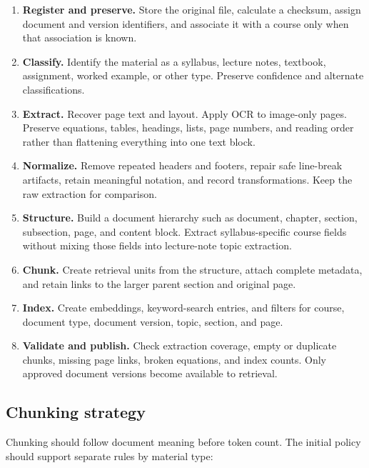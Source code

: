 \documentclass[11pt]{article}
\begin{document}
\begin{enumerate}
    \item \textbf{Register and preserve.} Store the original file, calculate a checksum, assign document and version identifiers, and associate it with a course only when that association is known.
    \item \textbf{Classify.} Identify the material as a syllabus, lecture notes, textbook, assignment, worked example, or other type. Preserve confidence and alternate classifications.
    \item \textbf{Extract.} Recover page text and layout. Apply OCR to image-only pages. Preserve equations, tables, headings, lists, page numbers, and reading order rather than flattening everything into one text block.
    \item \textbf{Normalize.} Remove repeated headers and footers, repair safe line-break artifacts, retain meaningful notation, and record transformations. Keep the raw extraction for comparison.
    \item \textbf{Structure.} Build a document hierarchy such as document, chapter, section, subsection, page, and content block. Extract syllabus-specific course fields without mixing those fields into lecture-note topic extraction.
    \item \textbf{Chunk.} Create retrieval units from the structure, attach complete metadata, and retain links to the larger parent section and original page.
    \item \textbf{Index.} Create embeddings, keyword-search entries, and filters for course, document type, document version, topic, section, and page.
    \item \textbf{Validate and publish.} Check extraction coverage, empty or duplicate chunks, missing page links, broken equations, and index counts. Only approved document versions become available to retrieval.
\end{enumerate}

\subsection{Chunking strategy}

Chunking should follow document meaning before token count. The initial policy should support separate rules by material type:
\end{document}
